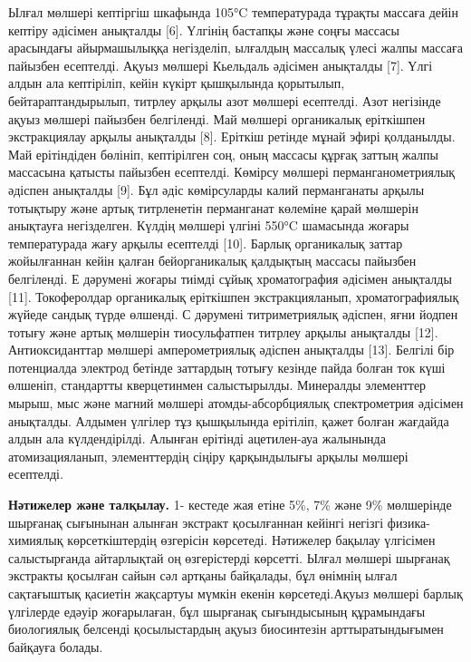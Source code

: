 \begin{multicols}{2}
Ылғал мөлшері кептіргіш шкафында 105°C температурада тұрақты массаға
дейін кептіру әдісімен анықталды {[}6{]}. Үлгінің бастапқы және соңғы
массасы арасындағы айырмашылыққа негізделіп, ылғалдың массалық үлесі
жалпы массаға пайызбен есептелді. Ақуыз мөлшері Кьельдаль әдісімен
анықталды {[}7{]}. Үлгі алдын ала кептіріліп, кейін күкірт қышқылында
қорытылып, бейтараптандырылып, титрлеу арқылы азот мөлшері есептелді.
Азот негізінде ақуыз мөлшері пайызбен белгіленді. Май мөлшері
органикалық еріткішпен экстракциялау арқылы анықталды {[}8{]}. Еріткіш
ретінде мұнай эфирі қолданылды. Май ерітіндіден бөлініп, кептірілген
соң, оның массасы құрғақ заттың жалпы массасына қатысты пайызбен
есептелді. Көмірсу мөлшері перманганометриялық әдіспен анықталды
{[}9{]}. Бұл әдіс көмірсуларды калий перманганаты арқылы тотықтыру және
артық титрленетін перманганат көлеміне қарай мөлшерін анықтауға
негізделген. Күлдің мөлшері үлгіні 550°C шамасында жоғары температурада
жағу арқылы есептелді {[}10{]}. Барлық органикалық заттар жойылғаннан
кейін қалған бейорганикалық қалдықтың массасы пайызбен белгіленді. Е
дәрумені жоғары тиімді сұйық хроматография әдісімен анықталды {[}11{]}.
Токоферолдар органикалық еріткішпен экстракцияланып, хроматографиялық
жүйеде сандық түрде өлшенді. С дәрумені титриметриялық әдіспен, яғни
йодпен тотығу және артық мөлшерін тиосульфатпен титрлеу арқылы анықталды
{[}12{]}. Антиоксиданттар мөлшері амперометриялық әдіспен анықталды
{[}13{]}. Белгілі бір потенциалда электрод бетінде заттардың тотығу
кезінде пайда болған ток күші өлшеніп, стандартты кверцетинмен
салыстырылды. Минералды элементтер мырыш, мыс және магний мөлшері
атомды-абсорбциялық спектрометрия әдісімен анықталды. Алдымен үлгілер
тұз қышқылында ерітіліп, қажет болған жағдайда алдын ала күлдендірілді.
Алынған ерітінді ацетилен-ауа жалынында атомизацияланып, элементтердің
сіңіру қарқындылығы арқылы мөлшері есептелді.

{\bfseries Нәтижелер және талқылау.} 1- кестеде жая етіне 5\%, 7\% және 9\%
мөлшерінде шырғанақ сығынынан алынған экстракт қосылғаннан кейінгі
негізгі физика-химиялық көрсеткіштердің өзгерісін көрсетеді. Нәтижелер
бақылау үлгісімен салыстырғанда айтарлықтай оң өзгерістерді көрсетті.
Ылғал мөлшері шырғанақ экстракты қосылған сайын сәл артқаны байқалады,
бұл өнімнің ылғал сақтағыштық қасиетін жақсартуы мүмкін екенін
көрсетеді.Ақуыз мөлшері барлық үлгілерде едәуір жоғарылаған, бұл
шырғанақ сығындысының құрамындағы биологиялық белсенді қосылыстардың
ақуыз биосинтезін арттыратындығымен байқауға болады.
\end{multicols}


